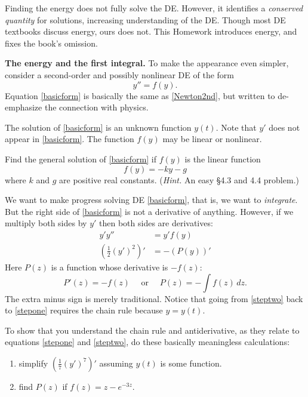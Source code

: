 \documentclass[12pt]{article}
\theoremstyle{definition}
\begin{document}
Finding the energy does not fully solve the DE.  However, it identifies a \emph{conserved quantity} for solutions, increasing understanding of the DE.  Though most DE textbooks discuss energy, ours does not.  This Homework introduces energy, and fixes the book's omission.

\medskip
\textbf{The energy and the first integral.}  To make the appearance even simpler, consider a second-order and possibly nonlinear DE of the form
\begin{equation}
y'' = f(y). \label{basicform}
\end{equation}
Equation \eqref{basicform} is basically the same as \eqref{Newton2nd}, but written to de-emphasize the connection with physics.

The solution of \eqref{basicform} is an unknown function $y(t)$.    Note that $y'$ does not appear in \eqref{basicform}.  The function $f(y)$ may be linear or nonlinear.

\begin{prob}
Find the general solution of \eqref{basicform} if $f(y)$ is the linear function
    $$f(y) = -ky - g$$
where $k$ and $g$ are positive real constants.  (\emph{Hint.}  An easy \S 4.3 and 4.4 problem.)
\end{prob}

We want to make progress solving DE \eqref{basicform}, that is, we want to \emph{integrate}.  But the right side of \eqref{basicform} is not a derivative of anything.  However, if we multiply both sides by $y'$ then both sides are derivatives:
\begin{align}
y' y'' &= y' f(y) \label{stepone} \\
\left(\frac{1}{2} (y')^2\right)' &= - \left(P(y)\right)'  \label{steptwo}
\end{align}
Here $P(z)$ is a function whose derivative is $-f(z)$:
    $$P'(z)=-f(z) \quad \text{ or } \quad P(z) = -\int f(z)\,dz.$$
The extra minus sign is merely traditional.  Notice that going from \eqref{steptwo} back to \eqref{stepone} requires the chain rule because $y=y(t)$.

\begin{prob}
To show that you understand the chain rule and antiderivative, as they relate to equations \eqref{stepone} and \eqref{steptwo}, do these basically meaningless calculations:
\renewcommand{\labelenumi}{\roman{enumi})}
\begin{enumerate}
\item simplify $\left(\frac{1}{7} (y')^7\right)'$ assuming $y(t)$ is some function.
\item find $P(z)$ if $f(z)=z-e^{-3 z}$.
\end{enumerate}
\end{prob}
\end{document}
